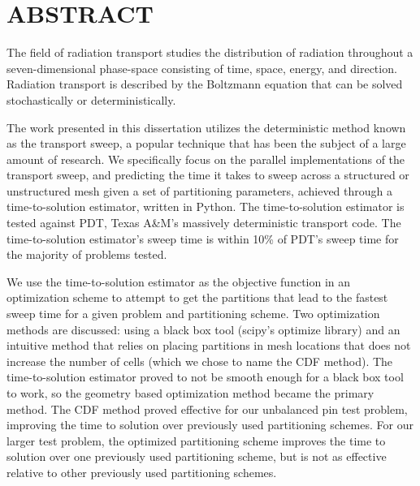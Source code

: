 %
%
%
%

\chapter*{ABSTRACT}

\pagestyle{plain} %
\setcounter{page}{2}

\indent The field of radiation transport studies the distribution of radiation throughout a seven-dimensional phase-space consisting of time, space, energy, and direction. Radiation transport is described by the Boltzmann equation that can be solved stochastically or deterministically.

The work presented in this dissertation utilizes the deterministic method known as the transport sweep, a popular technique that has been the subject of a large amount of research.
We specifically focus on the parallel implementations of the transport sweep, and predicting the time it takes to sweep across a structured or unstructured mesh given a set of partitioning parameters, achieved through a time-to-solution estimator, written in Python.
The time-to-solution estimator is tested against PDT, Texas A\&M's massively deterministic transport code.
The time-to-solution estimator's sweep time is within 10\% of PDT's sweep time for the majority of problems tested.

We use the time-to-solution estimator as the objective function in an optimization scheme to attempt to get the partitions that lead to the fastest sweep time for a given problem and partitioning scheme.
Two optimization methods are discussed: using a black box tool (scipy's optimize library) and an intuitive method that relies on placing partitions in mesh locations that does not increase the number of cells (which we chose to name the CDF method).
The time-to-solution estimator proved to not be smooth enough for a black box tool to work, so the geometry based optimization method became the primary method.
The CDF method proved effective for our unbalanced pin test problem, improving the time to solution over previously used partitioning schemes.
For our larger test problem, the optimized partitioning scheme improves the time to solution over one previously used partitioning scheme, but is not as effective relative to other previously used partitioning schemes.
\pagebreak{}

